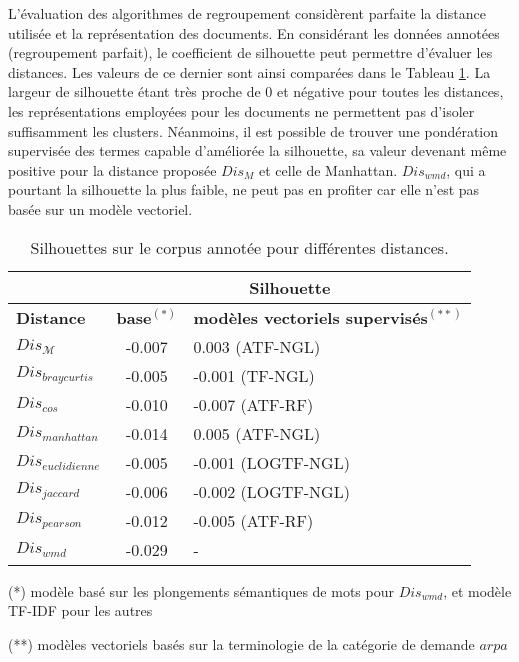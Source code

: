 L'évaluation des algorithmes de regroupement considèrent parfaite la distance utilisée et la représentation des documents. En considérant les données annotées (regroupement parfait), le coefficient de silhouette peut  permettre d'évaluer les distances. Les valeurs de ce dernier sont ainsi comparées dans le Tableau \ref{tab:similarite:compare-dist-adequation}. La largeur de silhouette étant très proche de 0 et négative pour toutes les distances, les représentations employées pour les documents ne permettent pas d'isoler suffisamment les clusters. Néanmoins, il est possible de trouver une pondération supervisée des termes capable d'améliorée la silhouette, sa valeur devenant même positive pour la distance proposée $Dis_M$ et celle de Manhattan. $Dis_{wmd}$, qui a pourtant la silhouette la plus faible, ne peut pas en profiter car elle n'est pas basée sur un modèle vectoriel.

\begin{table}[!htb]
	\small
	\begin{center}
  \begin{tabular}{|l|c|l|}
  	\hline
  	 & \multicolumn{2}{c|}{\textbf{Silhouette}} \\ 
  	\hline
	\textbf{Distance} & \textbf{ base$^{(*)}$}  & \textbf{modèles vectoriels supervisés$^{(**)}$} \\ \hline
	$Dis_\mathcal{M}$ &-0.007& 0.003 (ATF-NGL) \\ \hline
	$Dis_{braycurtis}$ &-0.005& -0.001 (TF-NGL)\\ \hline
	$Dis_{cos}$ &-0.010& -0.007 (ATF-RF)\\ \hline
	$Dis_{manhattan}$ &-0.014& 0.005 (ATF-NGL) \\ \hline
	$Dis_{euclidienne}$ &-0.005& -0.001 (LOGTF-NGL)  \\ \hline
	$Dis_{jaccard}$ &-0.006& -0.002 (LOGTF-NGL) \\ \hline
	$Dis_{pearson}$ &-0.012& -0.005 (ATF-RF)\\ \hline
	$Dis_{wmd}$  &-0.029& -\\ \hline	
  \end{tabular}
\end{center}
\scriptsize
(*) modèle basé sur les plongements sémantiques de mots pour $Dis_{wmd}$, et modèle TF-IDF pour les autres

(**) modèles vectoriels basés sur la terminologie de la catégorie de demande $arpa$

	\caption{Silhouettes sur le corpus annotée pour différentes distances.} \label{tab:similarite:compare-dist-adequation}
\end{table}

